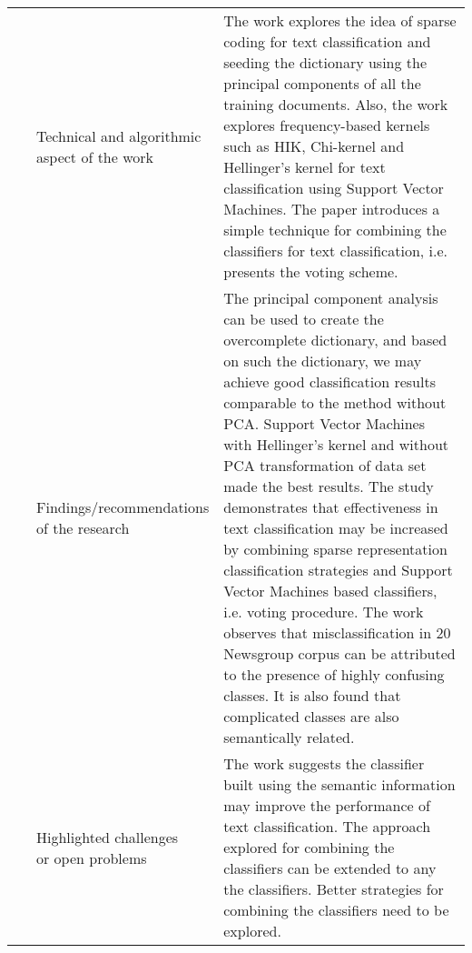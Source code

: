 \begin{landscape}
\begin{longtable}{lp{}p{}}
	\multirow{3}[0]{*}{~\citep{Sharma2016}} & 
    \specialcell{Technical and algorithmic \\ aspect of the work} &
    The work explores the idea of sparse coding for text classification and seeding the dictionary using the principal components of all the training documents. Also, the work explores frequency-based kernels such as HIK, Chi-kernel and Hellinger’s kernel for text classification using Support Vector Machines. The paper introduces a simple technique for combining the classifiers for text classification, i.e. presents the voting scheme.    
    \\ & 
    \specialcell{Findings/recommendations \\ of the research} & 
    The principal component analysis can be used to create the overcomplete dictionary, and based on such the dictionary, we may achieve good classification results comparable to the method without PCA. Support Vector Machines with Hellinger’s kernel and without PCA transformation of data set made the best results. The study demonstrates that effectiveness in text classification may be increased by combining sparse representation classification strategies and Support Vector Machines based classifiers, i.e. voting procedure. The work observes that misclassification in 20 Newsgroup corpus can be attributed to the presence of highly confusing classes. It is also found that complicated classes are also semantically related.
    \\ & 
    \specialcell{Highlighted challenges \\ or open problems} & 
    The work suggests the classifier built using the semantic information may improve the performance of text classification.  The approach explored for combining the classifiers can be extended to any the classifiers. Better strategies for combining the classifiers need to be explored.
	\\
	

\end{longtable}
\end{landscape}
